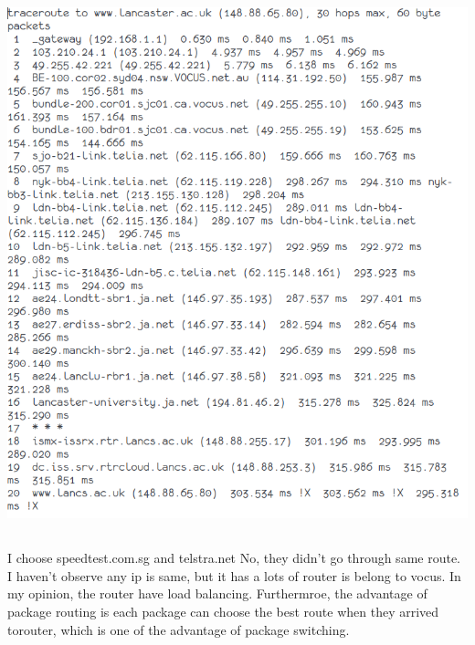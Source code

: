 \documentclass{article}
\begin{document}
\includegraphics[width=\textwidth]{img/tr_lancaster.png}


\subsection{}
I choose speedtest.com.sg and telstra.net
No, they  didn't go through same  route. I haven't observe any ip is same, but it has a lots of router is belong to vocus. In my opinion, the router have load balancing. Furthermroe, the advantage of package routing is each package can choose the best route when they arrived torouter, which is one of the advantage of package switching. 
\end{document}
